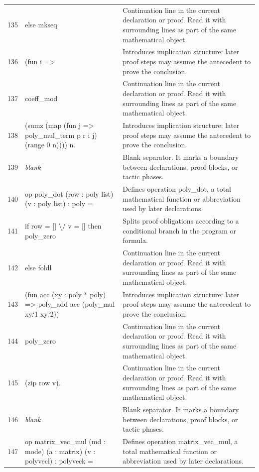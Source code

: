 \documentclass[10pt]{article}
\begin{document}
\begin{longtable}{r L{0.53\textwidth} L{0.37\textwidth}}
135 & {\ttfamily\scriptsize   else mkseq} & Continuation line in the current declaration or proof.  Read it with surrounding lines as part of the same mathematical object. \\
136 & {\ttfamily\scriptsize     (fun i =>} & Introduces implication structure: later proof steps may assume the antecedent to prove the conclusion. \\
137 & {\ttfamily\scriptsize       coeff\_mod} & Continuation line in the current declaration or proof.  Read it with surrounding lines as part of the same mathematical object. \\
138 & {\ttfamily\scriptsize         (sumz (map (fun j => poly\_mul\_term p r i j) (range 0 n)))) n.} & Introduces implication structure: later proof steps may assume the antecedent to prove the conclusion. \\
139 & {\ttfamily\scriptsize \emph{blank}} & Blank separator.  It marks a boundary between declarations, proof blocks, or tactic phases. \\
140 & {\ttfamily\scriptsize op poly\_dot (row : poly list) (v : poly list) : poly =} & Defines operation poly\_dot, a total mathematical function or abbreviation used by later declarations. \\
141 & {\ttfamily\scriptsize   if row = [] \textbackslash{}/ v = [] then poly\_zero} & Splits proof obligations according to a conditional branch in the program or formula. \\
142 & {\ttfamily\scriptsize   else foldl} & Continuation line in the current declaration or proof.  Read it with surrounding lines as part of the same mathematical object. \\
143 & {\ttfamily\scriptsize     (fun acc (xy : poly * poly) => poly\_add acc (poly\_mul xy.`1 xy.`2))} & Introduces implication structure: later proof steps may assume the antecedent to prove the conclusion. \\
144 & {\ttfamily\scriptsize     poly\_zero} & Continuation line in the current declaration or proof.  Read it with surrounding lines as part of the same mathematical object. \\
145 & {\ttfamily\scriptsize     (zip row v).} & Continuation line in the current declaration or proof.  Read it with surrounding lines as part of the same mathematical object. \\
146 & {\ttfamily\scriptsize \emph{blank}} & Blank separator.  It marks a boundary between declarations, proof blocks, or tactic phases. \\
147 & {\ttfamily\scriptsize op matrix\_vec\_mul (md : mode) (a : matrix) (v : polyvecl) : polyveck =} & Defines operation matrix\_vec\_mul, a total mathematical function or abbreviation used by later declarations. \\

\end{longtable}
\end{document}
